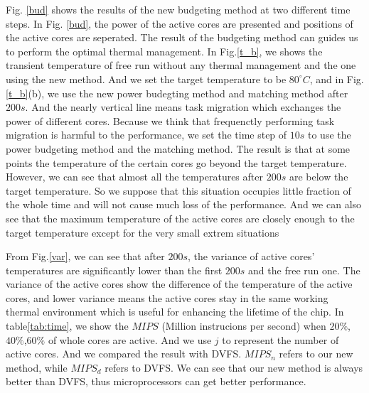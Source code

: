 Fig. \ref{bud} shows the results of the new budgeting method at two different time steps. In Fig. \ref{bud}, the power of the active cores are presented and positions of the active cores are seperated. The result of the budgeting method can guides us to perform the optimal thermal management. 
In Fig.\ref{t_b}, we shows the transient temperature of free run without any thermal management and the one using the new method. And we set the target temperature to be $80^ \circ C $, and in Fig.\ref{t_b}(b), we use the new power budegting method and matching method after $200 s$. And the nearly vertical line means task migration which exchanges the power of different cores. Because we think that frequenctly performing task migration is harmful to the performance, we set the time step of $10s$ to use the power budgeting method and the matching method. The result is that at some points the temperature of the certain cores go beyond the target temperature. However, we can see that almost all the temperatures after $200 s$ are below the target temperature. So we suppose that this situation occupies little fraction of the whole time and will not cause much loss of the performance. And we can also see that the maximum temperature of the active cores are closely enough to the target temperature except for the very small extrem situations


From Fig.\ref{var}, we can see that after $200 s$, the variance of active cores' temperatures are significantly lower than the first $200 s$ and the free run one. The variance of the active cores show the difference of the temperature of the active cores, and lower variance means the active cores stay in the same working thermal environment which is useful for enhancing the lifetime of the chip. In table\ref{tab:time}, we show the $MIPS$ (Million instrucions per second) when $20\%$,$40\%$,$60\%$ of whole cores are active. And we use $j$ to represent the number of active cores. And we compared the result with DVFS. $MIPS_n$ refers to our new method, while $MIPS_d$ refers to DVFS. We can see that our new method is always better than DVFS, thus microprocessors can get better performance. 

